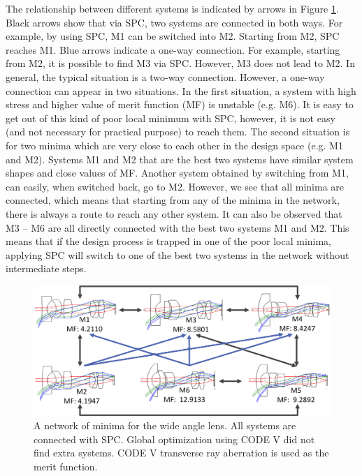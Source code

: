 The relationship between different systems is indicated by arrows in Figure \ref{fig:WAL_network}. Black arrows show that via SPC, two systems are connected in both ways. For example, by using SPC, M1 can be switched into M2. Starting from M2, SPC reaches M1. Blue arrows indicate a one-way connection. For example, starting from M2, it is possible to find M3 via SPC. However, M3 does not lead to M2. In general, the typical situation is a two-way connection. However, a one-way connection can appear in two situations. In the first situation, a system with high stress and higher value of merit function (MF) is unstable (e.g. M6). It is easy to get out of this kind of poor local minimum with SPC, however, it is not easy (and not necessary for practical purpose) to reach them. The second situation is for two minima which are very close to each other in the design space (e.g. M1 and M2). Systems M1 and M2 that are the best two systems have similar system shapes and close values of MF. Another system obtained by switching from M1, can easily, when switched back, go to M2. However, we see that all minima are connected, which means that starting from any of the minima in the network, there is always a route to reach any other system. It can also be observed that M3 – M6 are all directly connected with the best two systems M1 and M2. This means that if the design process is trapped in one of the poor local minima, applying SPC will switch to one of the best two systems in the network without intermediate steps.  

\begin{figure}[h!]
    \centering
    \includegraphics[width=\textwidth]{chapter-4/figures/WAL_network.png}
    \caption{A network of minima for the wide angle lens. All systems are connected with SPC. Global optimization using CODE V did not find extra systems. CODE V transverse ray aberration is used as the merit function.}
    \label{fig:WAL_network}
\end{figure}

